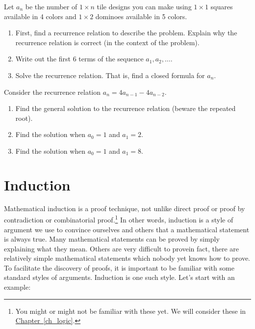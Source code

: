 \documentclass[11pt,]{book}
\theoremstyle{ptxplainnotitle}
\theoremstyle{ptxplaintitle}
\theoremstyle{ptxdefinitionnotitle}
\theoremstyle{ptxdefinitiontitle}
\theoremstyle{ptxdefinitionnotitle}
\theoremstyle{ptxdefinitiontitle}
\theoremstyle{ptxdefinitionnotitle}
\theoremstyle{ptxdefinitiontitle}
\theoremstyle{ptxdefinitiontitlenonumber}
\theoremstyle{ptxdefinitiontitlenonumber}
\numberwithin{equation}{chapter}
\begin{document}
\begin{divisionexercise}{11}\hypertarget{exercise-52}{}
\hypertarget{p-510}{}%
Let \(a_n\) be the number of \(1 \times n\) tile designs you can make using \(1 \times 1\) squares available in 4 colors and \(1 \times 2\) dominoes available in 5 colors.%
\leavevmode%
\begin{enumerate}[label=(\alph*)]
\item\hypertarget{li-234}{}\hypertarget{p-511}{}%
First, find a recurrence relation to describe the problem. Explain why the recurrence relation is correct (in the context of the problem). %
\item\hypertarget{li-235}{}\hypertarget{p-512}{}%
Write out the first 6 terms of the sequence \(a_1, a_2, \ldots\). %
\item\hypertarget{li-236}{}\hypertarget{p-513}{}%
Solve the recurrence relation. That is, find a closed formula for \(a_n\). %
\end{enumerate}
\end{divisionexercise}%
\begin{divisionexercise}{12}\hypertarget{exercise-53}{}
\hypertarget{p-514}{}%
Consider the recurrence relation \(a_n = 4a_{n-1} - 4a_{n-2}\).%
\leavevmode%
\begin{enumerate}[label=(\alph*)]
\item\hypertarget{li-237}{}\hypertarget{p-515}{}%
Find the general solution to the recurrence relation (beware the repeated root). %
\item\hypertarget{li-238}{}\hypertarget{p-516}{}%
Find the solution when \(a_0 = 1\) and \(a_1 = 2\). %
\item\hypertarget{li-239}{}\hypertarget{p-517}{}%
Find the solution when \(a_0 = 1\) and \(a_1 = 8\). %
\end{enumerate}
\end{divisionexercise}%
\typeout{************************************************}
\typeout{************************************************}
\section[{Induction}]{Induction}\label{sec_seq-induction}
\hypertarget{p-518}{}%
 Mathematical induction is a proof technique, not unlike direct proof or proof by contradiction or combinatorial proof.\footnote{You might or might not be familiar with these yet.  We will consider these in \hyperref[ch_logic]{Chapter~\ref{ch_logic}}.\label{fn-3}} In other words, induction is a style of argument we use to convince ourselves and others that a mathematical statement is always true. Many mathematical statements can be proved by simply explaining what they mean. Others are very difficult to prove\textemdash{}in fact, there are relatively simple mathematical statements which nobody yet knows how to prove. To facilitate the discovery of proofs, it is important to be familiar with some standard styles of arguments. Induction is one such style. Let's start with an example:%
\typeout{************************************************}
\typeout{************************************************}
\end{document}
